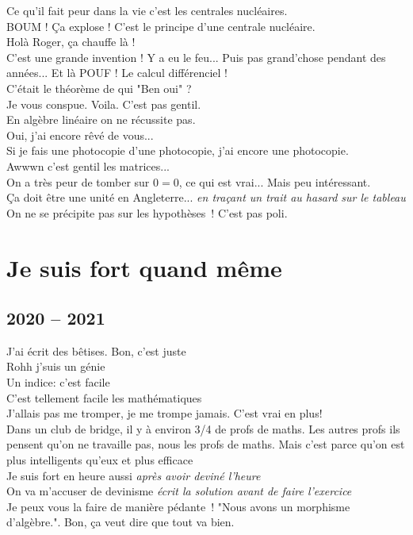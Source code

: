 \documentclass[french, a4paper, openany]{book}
\begin{document}
	\noindent \og Ce qu'il fait peur dans la vie c'est les centrales nucléaires. \fg \\
	\og BOUM ! Ça explose ! C'est le principe d'une centrale nucléaire. \fg \\
	\og Holà Roger, ça chauffe là ! \fg \\
	\og C'est une grande invention ! Y a eu le feu... Puis pas grand'chose pendant des années... Et là POUF ! Le calcul différenciel ! \fg \\
	\og C'était le théorème de qui "Ben oui" ? \fg \\
	\og Je vous conspue. Voila. C'est pas gentil. \fg \\
	\og En algèbre linéaire on ne récussite pas. \fg \\
	\og Oui, j'ai encore rêvé de vous... \fg \\
	\og Si je fais une photocopie d'une photocopie, j'ai encore une photocopie. \fg \\
	\og Awwwn c'est gentil les matrices... \fg \\
	\og On a très peur de tomber sur $0 = 0$, ce qui est vrai... Mais peu intéressant. \fg \\
	\og Ça doit être une unité en Angleterre... \fg \emph{en traçant un trait au hasard sur le tableau} \\
	\og On ne se précipite pas sur les hypothèses~! C'est pas poli. \fg \\

\chapter{Je suis fort quand même}

\section{2020 -- 2021}

	\noindent \og J'ai écrit des bêtises. Bon, c'est juste \fg \\
	\og Rohh j'suis un génie \fg \\
	\og Un indice: c'est facile \fg \\
	\og C'est tellement facile les mathématiques \fg \\
	\og J'allais pas me tromper, je me trompe jamais. C'est vrai en plus! \fg \\
	\og Dans un club de bridge, il y à environ 3/4 de profs de maths. Les autres profs ils pensent qu'on ne travaille pas, nous les profs de maths. Mais c'est parce qu'on est plus intelligents qu'eux et plus efficace \fg \\
	\og Je suis fort en heure aussi \fg \emph{après avoir deviné l'heure} \\
	\og On va m'accuser de devinisme \fg \emph{écrit la solution avant de faire l'exercice} \\
	\og Je peux vous la faire de manière pédante~! "Nous avons un morphisme d'algèbre.". Bon, ça veut dire que tout va bien. \fg \\
	
\end{document}
